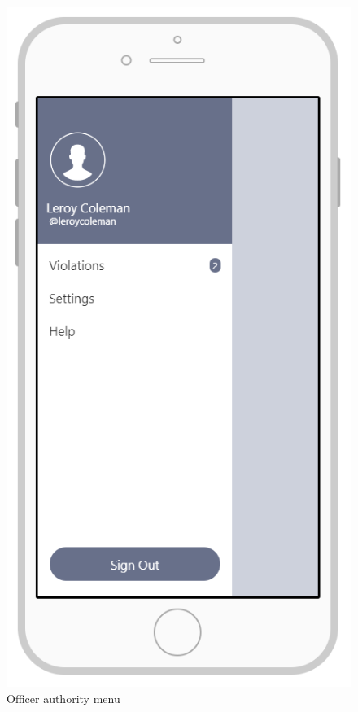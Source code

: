 \documentclass{article}
\begin{document}
\begin{figure}[H]
    \centering
    \includegraphics[scale=0.7]{Images/MenuOfficerAPP}
    \caption{Officer authority menu}
\end{figure}
\end{document}
